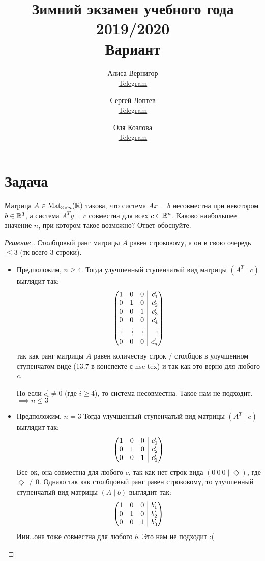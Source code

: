 \documentclass[a4paper]{article}
\title{Зимний экзамен учебного года 2019/2020\\Вариант \textnumero 1}
\author{	
    Алиса Вернигор       \\ \href{https://t.me/allisyonok}{Telegram} \and
	Сергей Лоптев        \\ \href{https://t.me/beast_sl}{Telegram} \and
	Оля Козлова        \\ \href{https://t.me/grenlayk}{Telegram}
}
\date{}
\makeatletter
\theoremstyle{remark}
\newenvironment{sysmatrix}[1]
{
    \left(\begin{array}{@{}#1@{}}
}
{\end{array}\right)}
\newcommand{\smt}[2]{\begin{sysmatrix}{#1} #2\end{sysmatrix}}
\makeatother
\begin{document}
	\maketitle
    \section*{Задача }

        Матрица $A \in \text{Mat}_{3 \times n}(\mathbb{R})$ такова, что система $Ax = b$ несовместна 
        при некотором $b \in \mathbb{R}^{3}$, а система $A^Ty = c$ совместна для всех $c \in \mathbb{R}^n$. 
        Каково наибольшее значение $n$, при котором такое возможно? Ответ обоснуйте. 
        \begin{proof}[Решение.]
            Столбцовый ранг матрицы $A$ равен строковому, а он в свою очередь $\leqslant 3$ 
            (тк всего 3 строки).

            \begin{itemize}
                \item Предположим, $n \geqslant 4$. Тогда улучшенный ступенчатый вид матрицы 
                $(A^T \mid c)$ выглядит так: 
                \[\smt{rrr|r} {
                    1 & 0 & 0 & c_1^{\prime} \\
                    0 & 1 & 0 & c_2^{\prime} \\
                    0 & 0 & 1 & c_3^{\prime} \\
                    0 & 0 & 0 & c_4^{\prime} \\
                    \vdots & \vdots & \vdots & \vdots\\
                    0 & 0 & 0 & c_n^{\prime}
                }\]
                так как ранг матрицы $A$ равен количеству строк / столбцов в улучшенном 
                ступенчатом виде (13.7 в конспекте с hse-tex) и так как это верно для любого $c$. 
                
                Но если $c_i^{\prime} \neq 0$ (где $i \geqslant 4$), то система несовместна. Такое нам не подходит. 
                $\implies n \leqslant 3$
                \item Предположим, $n = 3$ Тогда улучшенный ступенчатый вид матрицы 
                $(A^T \mid c)$ выглядит так:
                \[\smt{rrr|r} {
                    1 & 0 & 0 & c_1^{\prime} \\
                    0 & 1 & 0 & c_2^{\prime} \\
                    0 & 0 & 1 & c_3^{\prime} \\
                }\]
                Все ок, она совместна для любого $c$, так как нет строк вида $(0\ 0\ 0 \mid \Diamond)$, 
                где $\Diamond \neq 0$. Однако так как столбцовый ранг равен строковому, то 
                улучшенный ступенчатый вид матрицы 
                $(A \mid b)$ выглядит так:
                \[\smt{rrr|r} {
                    1 & 0 & 0 & b_1^{\prime} \\
                    0 & 1 & 0 & b_2^{\prime} \\
                    0 & 0 & 1 & b_3^{\prime} \\
                }\]
                Иии\dots она тоже совместна для любого $b$. Это нам не подходит :(


\end{itemize}
\end{proof}
\end{document}
